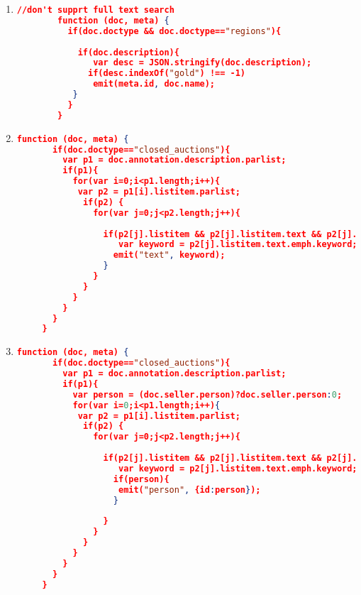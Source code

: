 \begin{enumerate}[label=Q\arabic*]
\begin{lstlisting}[language=JSON, basicstyle=\scriptsize]
	       }
	     }
	   }
	\end{lstlisting}
	
    \item \label{cb-q-14}%
	\begin{lstlisting}[language=JSON, basicstyle=\scriptsize]
		//don't supprt full text search
	 	function (doc, meta) {
	 	  if(doc.doctype && doc.doctype=="regions"){
	 	   
	 	    if(doc.description){
	 	       var desc = JSON.stringify(doc.description);
	 	      if(desc.indexOf("gold") !== -1)
	 	       emit(meta.id, doc.name);
	 	   }
	 	  }
	 	}
	\end{lstlisting}	

    \item \label{cb-q-15}%
	\begin{lstlisting}[language=JSON, basicstyle=\scriptsize]
	 function (doc, meta) {
	   if(doc.doctype=="closed_auctions"){
	     var p1 = doc.annotation.description.parlist;
	     if(p1){
	       for(var i=0;i<p1.length;i++){
	       	var p2 = p1[i].listitem.parlist;
	         if(p2) {
	           for(var j=0;j<p2.length;j++){
	             
	             if(p2[j].listitem && p2[j].listitem.text && p2[j].listitem.text.emph && p2[j].listitem.text.emph.keyword){
	             	var keyword = p2[j].listitem.text.emph.keyword;
	               emit("text", keyword);   
	             }
	           }
	         }
	       }
	     }
	   }
	 }
	\end{lstlisting}	

    \item \label{cb-q-16}%
	\begin{lstlisting}[language=JSON, basicstyle=\scriptsize]
	 function (doc, meta) {
	   if(doc.doctype=="closed_auctions"){
	     var p1 = doc.annotation.description.parlist;
	     if(p1){
	       var person = (doc.seller.person)?doc.seller.person:0;
	       for(var i=0;i<p1.length;i++){
	       	var p2 = p1[i].listitem.parlist;
	         if(p2) {
	           for(var j=0;j<p2.length;j++){
	             
	             if(p2[j].listitem && p2[j].listitem.text && p2[j].listitem.text.emph && p2[j].listitem.text.emph.keyword){
	             	var keyword = p2[j].listitem.text.emph.keyword;
	               if(person){
	               	emit("person", {id:person});     
	               }
	               
	             }
	           }
	         }
	       }
	     }
	   }
	 }
	\end{lstlisting}	


\end{enumerate}
